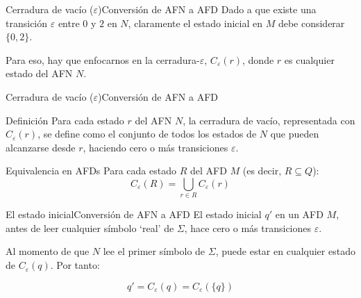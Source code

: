 \documentclass[spanish,handout]{beamer}
\begin{document}
  \begin{frame}{Cerradura de vacío ($\varepsilon$)}{Conversión de AFN a AFD}
    Dado a que existe una transición $\varepsilon$ entre $0$ y $2$ en $N$, claramente el estado inicial en $M$ debe considerar $\{0,2\}$.

    \begin{center}
    \end{center} \pause

    Para eso, hay que enfocarnos en la cerradura-$\varepsilon$, $C_\varepsilon (r)$, donde $r$ es cualquier estado del AFN $N$.      
  \end{frame}

  \begin{frame}{Cerradura de vacío ($\varepsilon$)}{Conversión de AFN a AFD}

    \begin{block}{Definición}
        Para cada estado $r$ del AFN $N$, la \alert{cerradura de vacío}, representada con $C_\varepsilon (r)$, se define como el conjunto de todos los estados de $N$ que pueden alcanzarse desde $r$, haciendo cero o más transiciones $\varepsilon$.
    \end{block} \pause

    \bigskip

    \begin{exampleblock}{Equivalencia en AFDs}
        Para cada estado $R$ del AFD $M$ (es decir, $R \subseteq Q$):
        \[C_\varepsilon (R) = \bigcup_{r \in R} C_\varepsilon (r)\]
    \end{exampleblock}

  \end{frame}

  \begin{frame}{El estado inicial}{Conversión de AFN a AFD}
      El \alert{estado inicial} $q'$ en un AFD $M$, antes de leer cualquier símbolo `real' de $\Sigma$, hace cero o más transiciones $\varepsilon$. \pause

      \bigskip

      Al momento de que $N$ lee el primer símbolo de $\Sigma$, puede estar en cualquier estado de $C_\varepsilon(q)$. Por tanto:

      \[q' = C_\varepsilon (q) = C_\varepsilon(\{q\})\]
  \end{frame}
\end{document}
